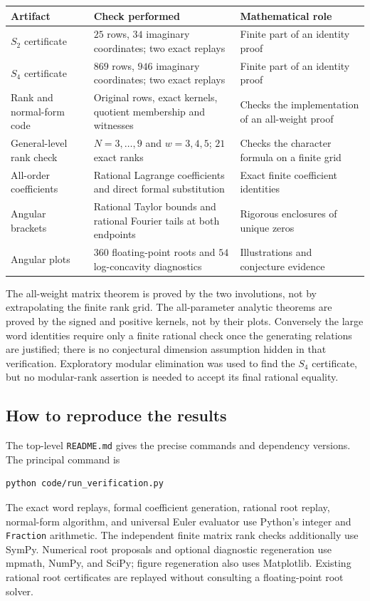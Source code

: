 \documentclass[11pt]{article}
\numberwithin{equation}{section}
\theoremstyle{plain}
\theoremstyle{definition}
\theoremstyle{remark}
\begin{document}
\begin{center}
\small
\begin{tabular}{@{}>{\raggedright\arraybackslash}p{}>{\raggedright\arraybackslash}p{}>{\raggedright\arraybackslash}p{}@{}}
\toprule
Artifact & Check performed & Mathematical role\\
\midrule
$S_2$ certificate & $25$ rows, $34$ imaginary coordinates;
two exact replays & Finite part of an identity proof\\[4pt]
$S_4$ certificate & $869$ rows, $946$ imaginary coordinates;
two exact replays & Finite part of an identity proof\\[4pt]
Rank and normal-form code & Original rows, exact kernels, quotient
membership and witnesses & Checks the implementation of an all-weight proof\\[4pt]
General-level rank check & $N=3,\ldots,9$ and $w=3,4,5$;
$21$ exact ranks & Checks the character formula on a finite grid\\[4pt]
All-order coefficients & Rational Lagrange coefficients and direct
formal substitution & Exact finite coefficient identities\\[4pt]
Angular brackets & Rational Taylor bounds and rational Fourier tails
at both endpoints & Rigorous enclosures of unique zeros\\[4pt]
Angular plots & $360$ floating-point roots and $54$ log-concavity
diagnostics & Illustrations and conjecture evidence\\
\bottomrule
\end{tabular}
\end{center}

The all-weight matrix theorem is proved by the two involutions, not
by extrapolating the finite rank grid. The all-parameter analytic
theorems are proved by the signed and positive kernels, not by their
plots. Conversely the large word identities require only a finite
rational check once the generating relations are justified; there is
no conjectural dimension assumption hidden in that verification.
Exploratory modular elimination was used to find the $S_4$ certificate,
but no modular-rank assertion is needed to accept its final rational
equality.

\subsection{How to reproduce the results}

The top-level \texttt{README.md} gives the precise commands and
dependency versions. The principal command is
\begin{verbatim}
python code/run_verification.py
\end{verbatim}
The exact word replays, formal coefficient generation, rational root
replay, normal-form algorithm, and universal Euler evaluator use
Python's integer and \texttt{Fraction} arithmetic. The independent
finite matrix rank checks additionally use SymPy. Numerical root
proposals and optional diagnostic regeneration use mpmath, NumPy, and
SciPy; figure regeneration also uses Matplotlib. Existing rational
root certificates are replayed without consulting a floating-point
root solver.
\end{document}
